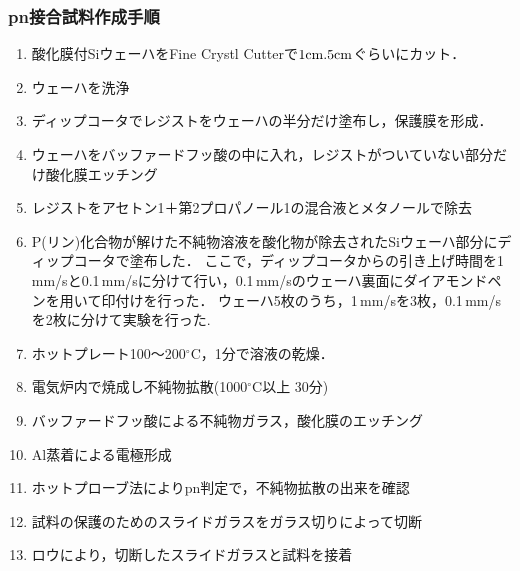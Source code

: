 \documentclass[11pt]{jarticle}
\begin{document}
		\subsubsection{pn接合試料作成手順}
			\begin{enumerate}
				\item 酸化膜付SiウェーハをFine Crystl Cutterで$1\mathrm{cm} \time 2.5\mathrm{cm}$ぐらいにカット．
				\item ウェーハを洗浄
				\item ディップコータでレジストをウェーハの半分だけ塗布し，保護膜を形成．
				\item ウェーハをバッファードフッ酸の中に入れ，レジストがついていない部分だけ酸化膜エッチング
				\item レジストをアセトン1＋第2プロパノール1の混合液とメタノールで除去
				\item P(リン)化合物が解けた不純物溶液を酸化物が除去されたSiウェーハ部分にディップコータで塗布した．
					  ここで，ディップコータからの引き上げ時間を1\,mm/sと0.1\,mm/sに分けて行い，0.1\,mm/sのウェーハ裏面にダイアモンドペンを用いて印付けを行った．
					  ウェーハ5枚のうち，1\,mm/sを3枚，0.1\,mm/sを2枚に分けて実験を行った.
				\item ホットプレート100～200$^\circ \mathrm{C}$，1分で溶液の乾燥．
				\item 電気炉内で焼成し不純物拡散(1000$^\circ \mathrm{C}$以上 30分)
				\item バッファードフッ酸による不純物ガラス，酸化膜のエッチング
				\item Al蒸着による電極形成
				\item ホットプローブ法によりpn判定で，不純物拡散の出来を確認
				\item 試料の保護のためのスライドガラスをガラス切りによって切断
				\item ロウにより，切断したスライドガラスと試料を接着
			\end{enumerate}
\end{document}
